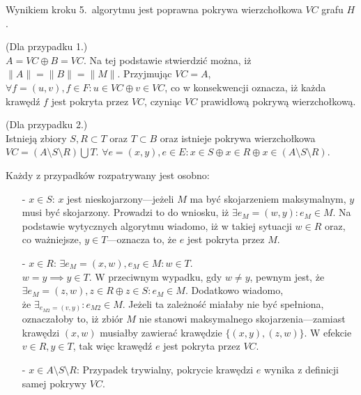 \begin{theorem}\label{theorem_nf1}
  Wynikiem kroku 5.\ algorytmu jest poprawna pokrywa wierzchołkowa $VC$
  grafu $H$.
\end{theorem}
\begin{bproof}
  (Dla przypadku 1.) \\
  $A = VC \oplus B = VC$.
  Na tej podstawie stwierdzić można, iż ${\|A\|=\|B\|=\|M\|}$.
  Przyjmując $VC = A$, $\forall{f=(u,v), f\in F}: u \in VC \oplus v \in VC$, co
  w konsekwencji oznacza, iż każda krawędź $f$ jest pokryta przez $VC$, czyniąc
  $VC$ prawidłową pokrywą wierzchołkową.
\end{bproof}
\begin{bproof}
  (Dla przypadku 2.) \\
  Istnieją zbiory $S, R \subset T$ oraz $T \subset B$ oraz istnieje pokrywa 
  wierzchołkowa \\ $VC=(A \setminus S \setminus R) \bigcup T$.
  ${\forall{e=(x,y), e \in E}: x \in S \oplus x \in R \oplus x \in (A \setminus S
  \setminus R)}$.


  Każdy z przypadków rozpatrywany jest osobno:
  \begin{itemize}
    \item[-] \underline{$x \in S$}: $x$ jest nieskojarzony---jeżeli $M$ ma być skojarzeniem 
      maksymalnym, $y$ musi być skojarzony.
      Prowadzi to do wniosku, iż $\exists{e_M=(w,y)}: e_M \in M$.
      Na podstawie wytycznych algorytmu wiadomo, iż w takiej sytuacji $w \in R$
      oraz, co ważniejsze, $y \in T$---oznacza to, że $e$ jest pokryta przez $M$.
    \item[-] \underline{$x \in R$}: $\exists{e_M=(x,w), e_M\in M}: w \in T$. \\
      $w=y \implies y \in T$.
      W przeciwnym wypadku, gdy $w \neq y$, pewnym jest, że $\exists{e_M=(z,w),
      z \in R \oplus z \in S}: e_M \in M$.
      Dodatkowo wiadomo,\\że ${\exists_{e_{M2}=(v,y)}: e_{M2} \in M}$.
      Jeżeli ta zależność miałaby nie być spełniona, oznaczałoby to, iż zbiór $M$
      nie stanowi maksymalnego skojarzenia---zamiast krawędzi $(x,w)$ musiałby
      zawierać krawędzie $\{(x,y),(z,w)\}$.
      W efekcie $v \in R, y \in T$, tak więc krawędź $e$ jest pokryta przez $VC$.
    \item[-] \underline{$x \in A \setminus S \setminus R$}: Przypadek trywialny,
      pokrycie krawędzi $e$ wynika z definicji samej pokrywy $VC$.
  \end{itemize}
\end{bproof}
